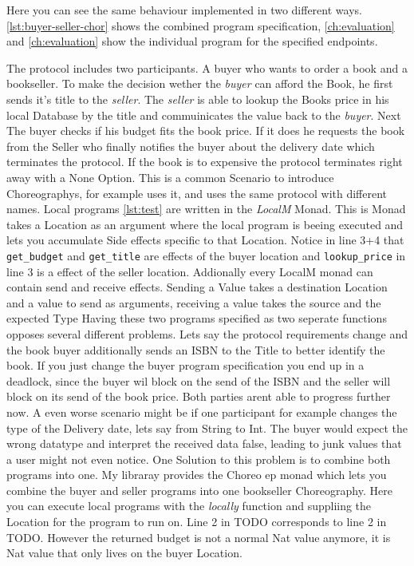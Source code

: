 Here you can see the same behaviour implemented in two different ways. \cref{lst:buyer-seller-chor} shows the combined program specification, \cref{ch:evaluation} and \cref{ch:evaluation} show the individual program for the specified endpoints.
\par
The protocol includes two participants. A buyer who wants to order a book and a bookseller. To make the decision wether the \emph{buyer} can afford the Book, he first sends it's title to the \emph{seller}. The \emph{seller} is able to lookup the Books price in his local Database by the title and commuinicates the value back to the \emph{buyer}. Next The buyer checks if his budget fits the book price. If it does he requests the book from the Seller who finally notifies the buyer about the delivery date which terminates the protocol. If the book is to expensive the protocol terminates right away with a None Option.
This is a common Scenario to introduce Choreographys, for example \cite{pirouette} uses it, and \cite{gentle-introduction-multiparty-sessiontypes} uses the same protocol with different names.
Local programs \cref{lst:test} are written in the \emph{LocalM} Monad. This is Monad takes a Location as an argument where the local program is beeing executed and lets you accumulate Side effects specific to that Location. Notice in line 3+4 %
that \lstinline!get_budget! and \lstinline!get_title! are effects of the buyer location and \lstinline!lookup_price! in line 3 is a effect of the seller location. Addionally every LocalM monad can contain send and receive effects. Sending a Value takes a destination Location and a value to send as arguments, receiving a value takes the source and the expected Type %
Having these two programs specified as two seperate functions opposes several different problems. Lets say the protocol requirements change and the book buyer additionally sends an ISBN to the Title to better identify the book. If you just change the buyer program specification you end up in a deadlock, since the buyer wil block on the send of the ISBN and the seller will block on its send of the book price. Both parties arent able to progress further now. A even worse scenario might be if one participant for example changes the type of the Delivery date, lets say from String to Int. The buyer would expect the wrong datatype and interpret the received data false, leading to junk values that a user might not even notice.
One Solution to this problem is to combine both programs into one. My libraray provides the Choreo ep monad which lets you combine the buyer and seller programs into one bookseller Choreography. Here you can execute local programs with the \emph{locally} function and suppliing the Location for the program to run on. Line 2 in TODO corresponds to line 2 in TODO. However the returned budget is not a normal Nat value anymore, it is Nat value that only lives on the buyer Location.%
